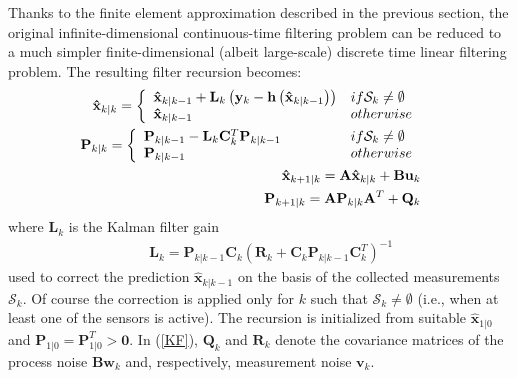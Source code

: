 \documentclass[journal]{IEEEtran}
\newcommand{\mb}{\mathbf}
\newcommand{\ba}{\begin{array}}
\newcommand{\ea}{\end{array}}
\begin{document}
	Thanks to the finite element approximation described in the previous section, the original infinite-dimensional continuous-time filtering problem can 
	be reduced to a much simpler finite-dimensional (albeit large-scale) discrete time linear filtering problem.
	The resulting filter recursion becomes:
	\begin{eqnarray}
	&& \hspace{-.8cm} \mb{\hat{x}}_{k|k} = \left \{
	\ba{ll}
	\mb{\hat{x}}_{k|k-1} + \mb{L}_k
	\left( \mb{y}_k - \mb{h} \left( \mb{\hat{x}}_{k|k-1} \right) \right) & \mbox{ if } \mathcal S_k \ne \emptyset \\
	\mb{\hat{x}}_{k|k-1}  & \mbox{ otherwise }
	\ea \right . \nonumber \\
	&&  \hspace{-.8cm} \mb{P}_{k|k} = \left \{
	\ba{ll}
	\mb{P}_{k|k-1} - \mb{L}_k  
	\mb{C}_k^T \mb{P}_{k|k-1} \quad \quad \quad \quad & \mbox{ if } \mathcal S_k \ne \emptyset  \\
	\mb{P}_{k|k-1}   & \mbox{ otherwise }
	\ea \right . \nonumber \\
	&& \hspace{-.8cm} \mb{\hat{x}}_{k+1|k}  =  \mb{A} \mb{\hat{x}}_{k|k} + \mb{B} \mb{u}_k \nonumber \\
	&& \hspace{-.8cm} \mb{P}_{k+1|k}  =  \mb{A} \mb{P}_{k|k} \mb{A}^T + \mb{Q}_k \label{KF}
	\end{eqnarray}
	where $ \mb{L}_k$ is the Kalman filter gain
	\begin{eqnarray}
			&& \mb{L}_k  =  \mb{P}_{k|k-1} \mb{C}_k \left( \mb{R}_k + \mb{C}_k \mb{P}_{k|k-1} \mb{C}_k^T \right)^{-1} \label{Gain}
	\end{eqnarray}
	used to correct the prediction $\mb{\hat{x}}_{k|k-1}$  on the basis of the collected measurements $\mathcal S_k$. Of course the correction is applied only
	for $k$ such that $\mathcal S_k \ne \emptyset $ (i.e., when at least one of the sensors is active). 
	The recursion is initialized from suitable $\mb{\hat{x}}_{1|0}$ and $\mb{P}_{1|0} = \mb{P}_{1|0}^T > \mb{0}$.
	In (\ref{KF}), $\mb{Q}_k$ and $\mb{R}_k$ denote the covariance matrices of the process noise $\mb{B} \mb{w}_k$ and, respectively, measurement noise $\mb{v}_k$.
\end{document}
